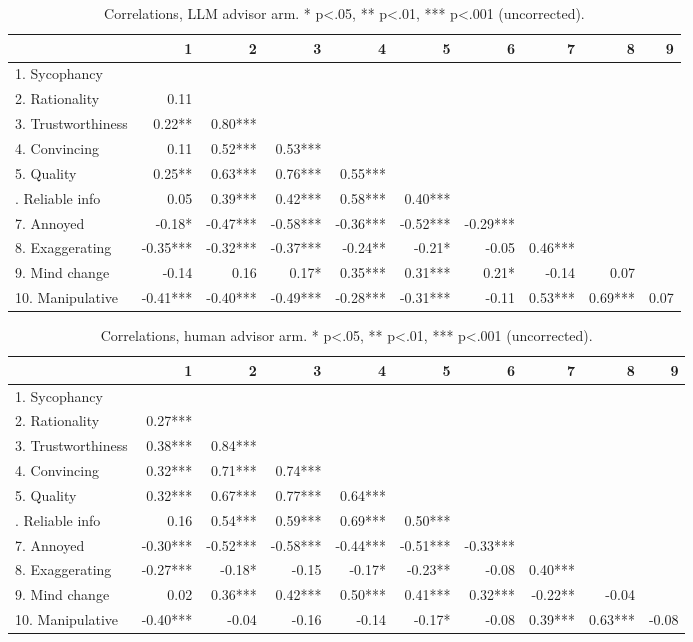 \begin{table}

\caption{\label{tab:cor_llm}Correlations, LLM advisor arm. * p<.05, ** p<.01, *** p<.001 (uncorrected).}
\centering
\begin{tabular}[t]{lrrrrrrrrr}
\toprule
  & 1 & 2 & 3 & 4 & 5 & 6 & 7 & 8 & 9\\
\midrule
1. Sycophancy &  &  &  &  &  &  &  &  & \\
2. Rationality & 0.11 &  &  &  &  &  &  &  & \\
3. Trustworthiness & 0.22** & 0.80*** &  &  &  &  &  &  & \\
4. Convincing & 0.11 & 0.52*** & 0.53*** &  &  &  &  &  & \\
5. Quality & 0.25** & 0.63*** & 0.76*** & 0.55*** &  &  &  &  & \\
\addlinespace
6. Reliable info & 0.05 & 0.39*** & 0.42*** & 0.58*** & 0.40*** &  &  &  & \\
7. Annoyed & -0.18* & -0.47*** & -0.58*** & -0.36*** & -0.52*** & -0.29*** &  &  & \\
8. Exaggerating & -0.35*** & -0.32*** & -0.37*** & -0.24** & -0.21* & -0.05 & 0.46*** &  & \\
9. Mind change & -0.14 & 0.16 & 0.17* & 0.35*** & 0.31*** & 0.21* & -0.14 & 0.07 & \\
10. Manipulative & -0.41*** & -0.40*** & -0.49*** & -0.28*** & -0.31*** & -0.11 & 0.53*** & 0.69*** & 0.07\\
\bottomrule
\end{tabular}
\end{table}

\begin{table}

\caption{\label{tab:cor_human}Correlations, human advisor arm. * p<.05, ** p<.01, *** p<.001 (uncorrected).}
\centering
\begin{tabular}[t]{lrrrrrrrrr}
\toprule
  & 1 & 2 & 3 & 4 & 5 & 6 & 7 & 8 & 9\\
\midrule
1. Sycophancy &  &  &  &  &  &  &  &  & \\
2. Rationality & 0.27*** &  &  &  &  &  &  &  & \\
3. Trustworthiness & 0.38*** & 0.84*** &  &  &  &  &  &  & \\
4. Convincing & 0.32*** & 0.71*** & 0.74*** &  &  &  &  &  & \\
5. Quality & 0.32*** & 0.67*** & 0.77*** & 0.64*** &  &  &  &  & \\
\addlinespace
6. Reliable info & 0.16 & 0.54*** & 0.59*** & 0.69*** & 0.50*** &  &  &  & \\
7. Annoyed & -0.30*** & -0.52*** & -0.58*** & -0.44*** & -0.51*** & -0.33*** &  &  & \\
8. Exaggerating & -0.27*** & -0.18* & -0.15 & -0.17* & -0.23** & -0.08 & 0.40*** &  & \\
9. Mind change & 0.02 & 0.36*** & 0.42*** & 0.50*** & 0.41*** & 0.32*** & -0.22** & -0.04 & \\
10. Manipulative & -0.40*** & -0.04 & -0.16 & -0.14 & -0.17* & -0.08 & 0.39*** & 0.63*** & -0.08\\
\bottomrule
\end{tabular}
\end{table}
